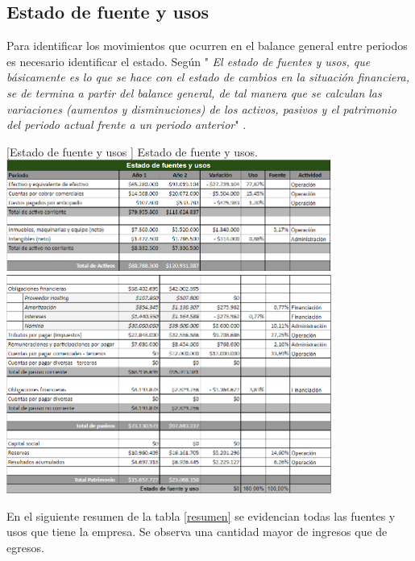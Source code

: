 \subsection{Estado de fuente y usos}

Para identificar los movimientos que ocurren en el balance general entre periodos es necesario identificar el estado. Según \textcite{gerencie_2020} " \textit{El estado de fuentes y usos, que básicamente es lo que se hace con el estado de cambios en la situación financiera, se de termina a partir del balance general, de tal manera que se calculan las variaciones (aumentos y disminuciones) de los activos, pasivos y el patrimonio del periodo actual frente a un periodo anterior}" .

\vspace{2mm}
\begin{minipage}{0.9\textwidth}
\centering
{}[{Estado de fuente y usos
}]{ Estado de fuente y usos. }
\label{financiacion}
\includegraphics[width=0.8\textwidth]{Images/estadoUsos1.png}
\includegraphics[width=0.8\textwidth]{Images/estadoUsos2.png}
\end{minipage}

En el siguiente resumen de la tabla \ref{resumen} se evidencian todas las fuentes y usos que tiene la empresa. Se observa una cantidad mayor de ingresos que de egresos.

